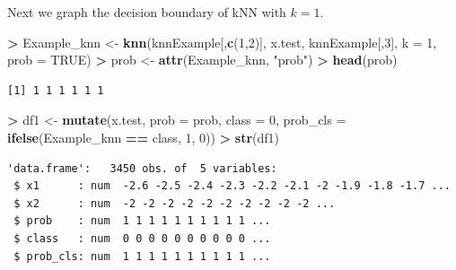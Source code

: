 \documentclass[
]{krantz}
\makeatletter
\newenvironment{Shaded}{\begin{snugshade}}{\end{snugshade}}
\newcommand{\DataTypeTok}[1]{\textcolor[rgb]{0.27,0.27,0.27}{#1}}
\newcommand{\DecValTok}[1]{\textcolor[rgb]{0.06,0.06,0.06}{#1}}
\newcommand{\KeywordTok}[1]{\textcolor[rgb]{0.27,0.27,0.27}{\textbf{#1}}}
\newcommand{\NormalTok}[1]{#1}
\newcommand{\OperatorTok}[1]{\textcolor[rgb]{0.43,0.43,0.43}{\textbf{#1}}}
\newcommand{\OtherTok}[1]{\textcolor[rgb]{0.37,0.37,0.37}{#1}}
\newcommand{\StringTok}[1]{\textcolor[rgb]{0.5,0.5,0.5}{#1}}
\newenvironment{kframe}{%
\medskip{}
\setlength{\fboxsep}{.8em}
 \def\at@end@of@kframe{}%
 \ifinner\ifhmode%
  \def\at@end@of@kframe{\end{minipage}}%
  \begin{minipage}{\columnwidth}%
 \fi\fi%
 \def\FrameCommand##1{\hskip\@totalleftmargin \hskip-\fboxsep
 \colorbox{shadecolor}{##1}\hskip-\fboxsep
     \hskip-\linewidth \hskip-\@totalleftmargin \hskip\columnwidth}%
 \MakeFramed {\advance\hsize-\width
   \@totalleftmargin\z@ \linewidth\hsize
   \@setminipage}}%
 {\par\unskip\endMakeFramed%
 \at@end@of@kframe}
\renewenvironment{Shaded}{\begin{kframe}}{\end{kframe}}
\makeatother
\begin{document}
Next we graph the decision boundary of kNN with \(k=1\).

\begin{Shaded}
\begin{Highlighting}[]
\OperatorTok{\textgreater{}}\StringTok{ }\NormalTok{Example\_knn \textless{}{-}}\StringTok{ }\KeywordTok{knn}\NormalTok{(knnExample[,}\KeywordTok{c}\NormalTok{(}\DecValTok{1}\NormalTok{,}\DecValTok{2}\NormalTok{)], x.test, knnExample[,}\DecValTok{3}\NormalTok{], }\DataTypeTok{k =} \DecValTok{1}\NormalTok{, }\DataTypeTok{prob =} \OtherTok{TRUE}\NormalTok{)}
\OperatorTok{\textgreater{}}\StringTok{ }\NormalTok{prob \textless{}{-}}\StringTok{ }\KeywordTok{attr}\NormalTok{(Example\_knn, }\StringTok{"prob"}\NormalTok{)}
\OperatorTok{\textgreater{}}\StringTok{ }\KeywordTok{head}\NormalTok{(prob)}
\end{Highlighting}
\end{Shaded}

\begin{verbatim}
[1] 1 1 1 1 1 1
\end{verbatim}

\begin{Shaded}
\begin{Highlighting}[]
\OperatorTok{\textgreater{}}\StringTok{ }\NormalTok{df1 \textless{}{-}}\StringTok{ }\KeywordTok{mutate}\NormalTok{(x.test, }\DataTypeTok{prob =}\NormalTok{ prob, }\DataTypeTok{class =} \DecValTok{0}\NormalTok{,  }\DataTypeTok{prob\_cls =} \KeywordTok{ifelse}\NormalTok{(Example\_knn }\OperatorTok{==}\StringTok{ }\NormalTok{class, }\DecValTok{1}\NormalTok{, }\DecValTok{0}\NormalTok{))}
\OperatorTok{\textgreater{}}\StringTok{ }\KeywordTok{str}\NormalTok{(df1)}
\end{Highlighting}
\end{Shaded}

\begin{verbatim}
'data.frame':   3450 obs. of  5 variables:
 $ x1      : num  -2.6 -2.5 -2.4 -2.3 -2.2 -2.1 -2 -1.9 -1.8 -1.7 ...
 $ x2      : num  -2 -2 -2 -2 -2 -2 -2 -2 -2 -2 ...
 $ prob    : num  1 1 1 1 1 1 1 1 1 1 ...
 $ class   : num  0 0 0 0 0 0 0 0 0 0 ...
 $ prob_cls: num  1 1 1 1 1 1 1 1 1 1 ...
\end{verbatim}
\end{document}
